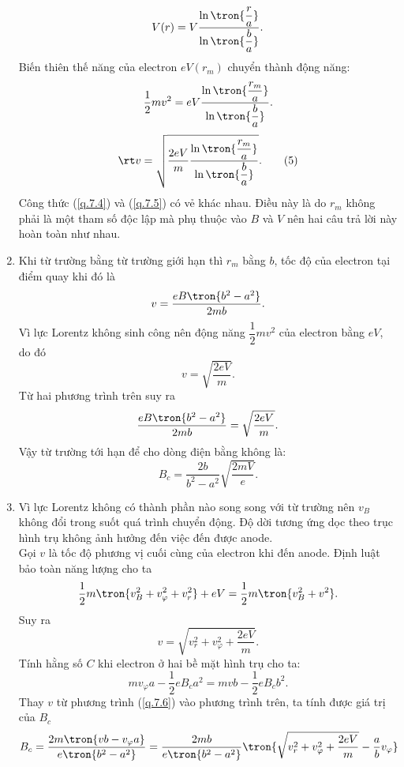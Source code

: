 \begin{loigiai}
\begin{enumerate}[1)]
    \[V(r) = V \dfrac{\ln \tron{\dfrac{r}{a}}}{\ln \tron{\dfrac{b}{a}}}.\]
    Biến thiên thế năng của electron $eV(r_m)$ chuyển thành động năng:
    \[\dfrac{1}{2}mv^2 = e  V \dfrac{\ln \tron{\dfrac{r_m}{a}}}{\ln \tron{\dfrac{b}{a}}}.\]
    \[\rt v = \sqrt{\dfrac{2eV}{m} \dfrac{\ln \tron{\dfrac{r_m}{a}}}{\ln \tron{\dfrac{b}{a}}}}.\tag{5}\label{q.7.5}\]
    Công thức (\ref{q.7.4}) và (\ref{q.7.5}) có vẻ khác nhau.   Điều này là do $r_m$ không phải là một tham số độc lập mà phụ thuộc vào $B$ và $V$ nên hai câu trả lời này hoàn toàn như nhau.
    \item Khi từ trường bằng từ trường giới hạn thì $r_m$ bằng $b$, tốc độ của electron tại điểm quay khi đó là 
    \[v = \dfrac{eB\tron{b^2 - a^2}}{2mb}.\]
    Vì lực Lorentz không sinh công nên động năng $\dfrac{1}{2}mv^2$ của electron bằng $eV$, do đó
    \[v = \sqrt{\dfrac{2eV}{m}}.\]
    Từ hai phương trình trên suy ra 
    \[\dfrac{eB\tron{b^2 - a^2}}{2mb} = \sqrt{\dfrac{2eV}{m}}. \]
    Vậy từ trường tới hạn để cho dòng điện bằng không là:
    \[B_c = \dfrac{2b}{b^2 - a^2} \sqrt{\dfrac{2mV}{e}}.\]
    \item Vì lực Lorentz không có thành phần nào song song với từ trường nên $v_B$ không đổi trong suốt quá trình chuyển động. Độ dời tương ứng dọc theo trục hình trụ không ảnh hưởng đến việc đến được anode.\\
    Gọi $v$ là tốc độ phương vị cuối cùng của electron khi đến anode. Định luật bảo toàn năng lượng cho ta 
    \[\dfrac{1}{2} m \tron{v_B^2 + v_\varphi^2 + v_r^2} + eV = \dfrac{1}{2}m \tron{v_B^2 + v^2}.\]
    Suy ra
    \[v = \sqrt{v_r^2 + v_\varphi^2 + \dfrac{2eV}{m}}.\tag{6}\label{q.7.6}\]
    Tính hằng số $C$ khi electron ở hai bề mặt hình trụ cho ta:
    \[mv_\varphi a - \dfrac{1}{2}eB_ca^2 = mvb - \dfrac{1}{2}eB_cb^2 .\]
    Thay $v$ từ phương trình (\ref{q.7.6}) vào phương trình trên, ta tính được giá trị của $B_c$
    \[B_c = \dfrac{2m\tron{vb - v_\varphi a}}{e\tron{b^2 - a^2}} = \dfrac{2mb}{e\tron{b^2 - a^2}} \tron{\sqrt{v_r^2 + v_\varphi^2 + \dfrac{2eV}{m}} - \dfrac{a}{b}v_\varphi}\]
\end{enumerate}
\end{loigiai}
